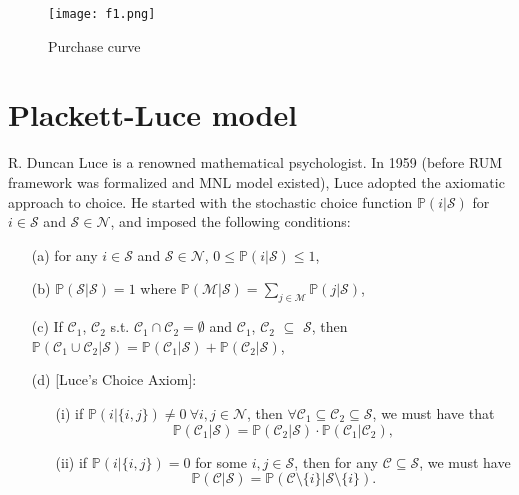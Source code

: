 \documentclass[11pt]{article}
\begin{document}
\begin{figure}[H]
	\centering
	\texttt{[image: f1.png]}
	\caption{Purchase curve}
\end{figure}

\section{Plackett-Luce model}
R. Duncan Luce is a renowned mathematical psychologist. In 1959 (before RUM framework was formalized and MNL model existed), Luce adopted the axiomatic approach to choice. He started with the stochastic choice function $\mathbb{P}(i|\mathcal{S})$ for $i\in \mathcal{S}$ and $\mathcal{S}\in \mathcal{N}$, and imposed the following conditions:
\begin{enumerate}
	\item[(a)] for any $i\in \mathcal{S}$ and $\mathcal{S}\in \mathcal{N}$, $0\leq \mathbb{P}(i|\mathcal{S})\leq 1$,
	\item[(b)] $\mathbb{P}(\mathcal{S}|\mathcal{S})=1$ where $\mathbb{P}(\mathcal{M}|\mathcal{S})=\sum\limits_{j\in \mathcal{M}}\mathbb{P}(j|\mathcal{S})$,
	\item[(c)] If $\mathcal{C}_1$, $\mathcal{C}_2$ s.t. $\mathcal{C}_1 \cap \mathcal{C}_2 = \emptyset$ and $\mathcal{C}_1$, $\mathcal{C}_2$ $\subseteq$ $\mathcal{S}$, then $\mathbb{P}(\mathcal{C}_1\cup \mathcal{C}_2|\mathcal{S})=\mathbb{P}(\mathcal{C}_1|\mathcal{S})+\mathbb{P}(\mathcal{C}_2|\mathcal{S})$,
	\item[(d)] [Luce's Choice Axiom]:\begin{enumerate}
		\item[(i)] if $\mathbb{P}(i|\{i,j\})\neq 0 \ \forall i,j\in \mathcal{N}$, then $\forall \mathcal{C}_1 \subseteq \mathcal{C}_2 \subseteq \mathcal{S}$, we must have that
		\begin{equation}
		\mathbb{P}(\mathcal{C}_1|\mathcal{S})=\mathbb{P}(\mathcal{C}_2|\mathcal{S})\cdot \mathbb{P}(\mathcal{C}_1|\mathcal{C}_2),
		\end{equation}
		\item[(ii)] if $\mathbb{P}(i|\{i,j\})=0$ for some $i,j\in \mathcal{S}$, then for any $\mathcal{C} \subseteq \mathcal{S}$, we must have
		\begin{equation}
		\mathbb{P}(\mathcal{C}|\mathcal{S})=\mathbb{P}(\mathcal{C}\setminus\{i\}|\mathcal{S}\setminus\{i\}).
		\end{equation}
	\end{enumerate}
\end{enumerate}
\end{document}
